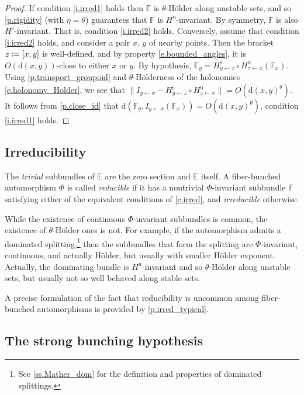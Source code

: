 \documentclass[10pt]{amsart}
\def\vcentcolon{\mathrel{\mathop\ordinarycolon}}
\providecommand\ordinarycolon{:}
\providecommand*\coloneqq{\vcentcolon\mathrel{\mkern-1.2mu}=}
\theoremstyle{plain}
\theoremstyle{definition}
\newcommand{\EE}{\mathbb{E}}
\newcommand{\FF}{\mathbb{F}}
\newcommand{\dd}{\mathrm{d}}
\newcommand{\uu}{\mathrm{u}}
\renewcommand{\ss}{\mathrm{s}}
\begin{document}
\begin{proof}
If condition \eqref{i.irred1} holds then $\FF$ is $\theta$-Hölder along unstable sets, and so \cref{p.rigidity} (with $\eta = \theta$) guarantees that $\FF$ is $H^\uu$-invariant. By symmetry, $\FF$ is also $H^\ss$-invariant. That is, condition \eqref{i.irred2} holds.
Conversely, assume that condition \eqref{i.irred2} holds, and consider a pair $x$, $y$ of nearby points.
Then the bracket $z \coloneqq [x,y]$ is well-defined, and by property \eqref{e.bounded_angles}, it is $O(\dd(x,y))$-close to either $x$ or $y$.
By hypothesis, $\FF_y = H^\ss_{y\gets z} \circ H^\uu_{z \gets x} (\FF_x)$.
Using \cref{p.transport_groupoid} and $\theta$-Hölderness of the holonomies \eqref{e.holonomy_Holder}, we see that $\|I_{y \gets x} - H^\ss_{y\gets z} \circ H^\uu_{z \gets x}\| = O(\dd(x,y)^\theta)$.
It follows from \cref{p.close_id} that
$\dd ( \FF_y, I_{y \gets x} (\FF_x)) = O(\dd(x,y)^\theta)$, \ie condition \eqref{i.irred1} holds.
\end{proof}

\subsection{Irreducibility}

The \emph{trivial} subbundles of $\EE$ are the zero section and $\EE$ itself.
A fiber-bunched automorphism $\Phi$ is called \emph{reducible} if it has a nontrivial $\Phi$-invariant subbundle $\FF$ satisfying either of the equivalent conditions of \cref{c.irred}, and \emph{irreducible} otherwise.

While the existence of continuous $\Phi$-invariant subbundles is common, the existence of $\theta$-Hölder ones is not. For example, if the automorphism admits a dominated splitting,\footnote{See \cref{ss.Mather_dom} for the definition and properties of dominated splittings.} then the subbundles that form the splitting are $\Phi$-invariant, continuous, and actually Hölder, but usually with smaller Hölder exponent. Actually, the dominating bundle is $H^\uu$-invariant and so $\theta$-Hölder along unstable sets, but usually not so well behaved along stable sets.

A precise formulation of the fact that reducibility is uncommon among fiber-bunched automorphisms is provided by \cref{p.irred_typical}.

\subsection{The strong bunching hypothesis}
\end{document}
